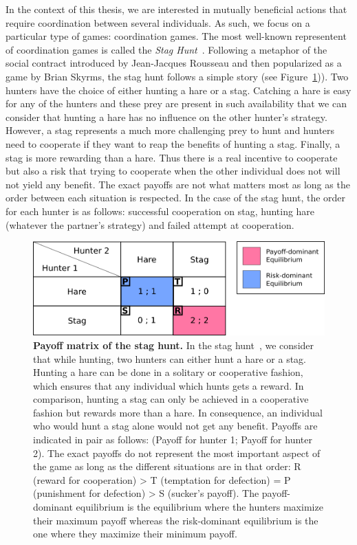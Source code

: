     In the context of this thesis, we are interested in mutually beneficial actions that require coordination between several individuals. As such, we focus on a particular type of games: coordination games. The most well-known representent of coordination games is called the \emph{Stag Hunt}~\parencite{Skyrms2004}. Following a metaphor of the social contract introduced by Jean-Jacques Rousseau and then popularized as a game by Brian Skyrms, the stag hunt follows a simple story (see Figure~\ref{fig:MatrixStagHunt})). Two hunters have the choice of either hunting a hare or a stag. Catching a hare is easy for any of the hunters and these prey are present in such availability that we can consider that hunting a hare has no influence on the other hunter's strategy. However, a stag represents a much more challenging prey to hunt and hunters need to cooperate if they want to reap the benefits of hunting a stag. Finally, a stag is more rewarding than a hare. Thus there is a real incentive to cooperate but also a risk that trying to cooperate when the other individual does not will not yield any benefit. The exact payoffs are not what matters most as long as the order between each situation is respected. In the case of the stag hunt, the order for each hunter is as follows: successful cooperation on stag, hunting hare (whatever the partner's strategy) and failed attempt at cooperation.

    \begin{figure}[hbt]
        \begin{center}
          \includegraphics[scale = 0.50]{fig/Intro/StagHunt.png}
          \caption{\textbf{Payoff matrix of the stag hunt.} 
          In the stag hunt~\parencite{Skyrms2004}, we consider that while hunting, two hunters can either hunt a hare or a stag. Hunting a hare can be done in a solitary or cooperative fashion, which ensures that any individual which hunts gets a reward. In comparison, hunting a stag can only be achieved in a cooperative fashion but rewards more than a hare. In consequence, an individual who would hunt a stag alone would not get any benefit. Payoffs are indicated in pair as follows: (Payoff for hunter 1; Payoff for hunter 2). The exact payoffs do not represent the most important aspect of the game as long as the different situations are in that order: R (reward for cooperation) > T (temptation for defection) = P (punishment for defection) > S (sucker's payoff). The payoff-dominant equilibrium is the equilibrium where the hunters maximize their maximum payoff whereas the risk-dominant equilibrium is the one where they maximize their minimum payoff.} 
          \label{fig:MatrixStagHunt}
        \end{center}
    \end{figure}

